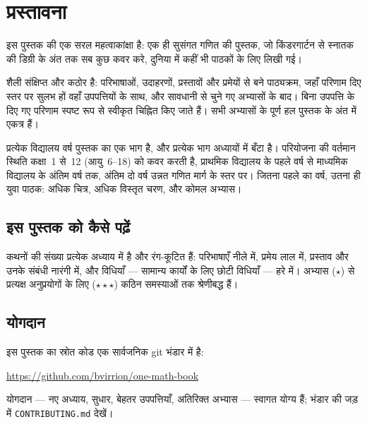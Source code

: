 \chapter{प्रस्तावना}

इस पुस्तक की एक सरल महत्वाकांक्षा है: एक ही सुसंगत गणित की पुस्तक, जो
किंडरगार्टन से स्नातक की डिग्री के अंत तक सब कुछ कवर करे, दुनिया में कहीं
भी पाठकों के लिए लिखी गई।

शैली संक्षिप्त और कठोर है: परिभाषाओं, उदाहरणों, प्रस्तावों और प्रमेयों से
बने पाठ्यक्रम, जहाँ परिणाम दिए स्तर पर सुलभ हों वहाँ उपपत्तियों के साथ,
और सावधानी से चुने गए अभ्यासों के बाद। बिना उपपत्ति के दिए गए परिणाम
स्पष्ट रूप से स्वीकृत चिह्नित किए जाते हैं। सभी अभ्यासों के पूर्ण हल
पुस्तक के अंत में एकत्र हैं।

प्रत्येक विद्यालय वर्ष पुस्तक का एक भाग है, और प्रत्येक भाग अध्यायों में
बँटा है। परियोजना की वर्तमान स्थिति कक्षा~1 से~12 (आयु~6--18) को कवर
करती है, प्राथमिक विद्यालय के पहले वर्ष से माध्यमिक विद्यालय के अंतिम
वर्ष तक, अंतिम दो वर्ष उन्नत गणित मार्ग के स्तर पर। जितना पहले का वर्ष,
उतना ही युवा पाठक: अधिक चित्र, अधिक विस्तृत चरण, और कोमल अभ्यास।

\section*{इस पुस्तक को कैसे पढ़ें}

कथनों की संख्या प्रत्येक अध्याय में है और रंग-कूटित हैं: परिभाषाएँ नीले
में, प्रमेय लाल में, प्रस्ताव और उनके संबंधी नारंगी में, और विधियाँ ---
सामान्य कार्यों के लिए छोटी विधियाँ --- हरे में। अभ्यास ($\star$) से
प्रत्यक्ष अनुप्रयोगों के लिए ($\star\star\star$) कठिन समस्याओं तक
श्रेणीबद्ध हैं।

\section*{योगदान}

इस पुस्तक का स्रोत कोड एक सार्वजनिक git भंडार में है:
\begin{center}
\url{https://github.com/bvirrion/one-math-book}
\end{center}
योगदान --- नए अध्याय, सुधार, बेहतर उपपत्तियाँ, अतिरिक्त अभ्यास ---
स्वागत योग्य हैं; भंडार की जड़ में \texttt{CONTRIBUTING.md} देखें।
